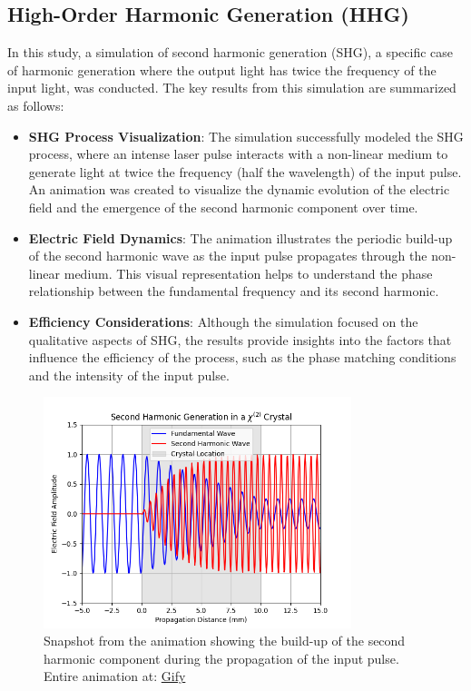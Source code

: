 \documentclass[12pt]{article}
\begin{document}
\subsection{High-Order Harmonic Generation (HHG)}

In this study, a simulation of second harmonic generation (SHG), a specific case of harmonic generation where the output light has twice the frequency of the input light, was conducted. The key results from this simulation are summarized as follows:

\begin{itemize}
    \item \textbf{SHG Process Visualization}: The simulation successfully modeled the SHG process, where an intense laser pulse interacts with a non-linear medium to generate light at twice the frequency (half the wavelength) of the input pulse. An animation was created to visualize the dynamic evolution of the electric field and the emergence of the second harmonic component over time.
    \item \textbf{Electric Field Dynamics}: The animation illustrates the periodic build-up of the second harmonic wave as the input pulse propagates through the non-linear medium. This visual representation helps to understand the phase relationship between the fundamental frequency and its second harmonic.
    \item \textbf{Efficiency Considerations}: Although the simulation focused on the qualitative aspects of SHG, the results provide insights into the factors that influence the efficiency of the process, such as the phase matching conditions and the intensity of the input pulse.
\end{itemize}

\begin{figure}[h!]
    \centering
    \includegraphics[width=0.8\textwidth]{../images/shg_snap.png}
    \caption{Snapshot from the animation showing the build-up of the second harmonic component during the propagation of the input pulse. Entire animation at: \href{https://i.giphy.com/media/v1.Y2lkPTc5MGI3NjExdm1nbWhlODkyeWljN21ydmRsa3prN3BhZWp2c29sbnl6b3g5NzQ0ayZlcD12MV9pbnRlcm5hbF9naWZfYnlfaWQmY3Q9Zw/bDFsLFIw86fGqPWW1a/giphy.gif}{Gify}}
    \label{fig:shg_visualization}
\end{figure}
\end{document}
